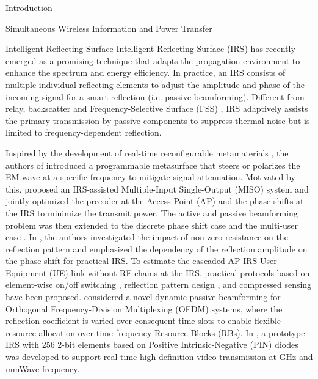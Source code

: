 \documentclass[journal]{IEEEtran}
\begin{document}
\begin{section}{Introduction}
\begin{subsection}{Simultaneous Wireless Information and Power Transfer}
		\end{subsection}


		\begin{subsection}{Intelligent Reflecting Surface}
			Intelligent Reflecting Surface (IRS) has recently emerged as a promising technique that adapts the propagation environment to enhance the spectrum and energy efficiency. In practice, an IRS consists of multiple individual reflecting elements to adjust the amplitude and phase of the incoming signal for a smart reflection (i.e. passive beamforming). Different from relay, backscatter and Frequency-Selective Surface (FSS) \cite{Anwar2018}, IRS adaptively assists the primary transmission by passive components to suppress thermal noise but is limited to frequency-dependent reflection.

			Inspired by the development of real-time reconfigurable metamaterials \cite{Cui2014}, the authors of \cite{Liaskos2018} introduced a programmable metasurface that steers or polarizes the EM wave at a specific frequency to mitigate signal attenuation. Motivated by this, \cite{Wu2018} proposed an IRS-assisted Multiple-Input Single-Output (MISO) system and jointly optimized the precoder at the Access Point (AP) and the phase shifts at the IRS to minimize the transmit power. The active and passive beamforming problem was then extended to the discrete phase shift case \cite{Wu2019a} and the multi-user case \cite{Wu2019}. In \cite{Abeywickrama2019}, the authors investigated the impact of non-zero resistance on the reflection pattern and emphasized the dependency of the reflection amplitude on the phase shift for practical IRS. To estimate the cascaded AP-IRS-User Equipment (UE) link without RF-chains at the IRS, practical protocols based on element-wise on/off switching \cite{Nadeem2019}, reflection pattern design \cite{You2019,Kang2020}, and compressed sensing \cite{Wang2020} have been proposed. \cite{Yang2020} considered a novel dynamic passive beamforming for Orthogonal Frequency-Division Multiplexing (OFDM) systems, where the reflection coefficient is varied over consequent time slots to enable flexible resource allocation over time-frequency Resource Blocks (RBs). In \cite{Dai2020}, a prototype IRS with \num{256} \num{2}-bit elements based on Positive Intrinsic-Negative (PIN) diodes was developed to support real-time high-definition video transmission at \si{GHz} and mmWave frequency.
		\end{subsection}



\end{section}
\end{document}

